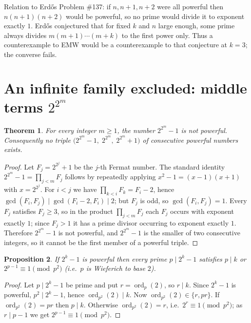 \documentclass[11pt]{article}
\newtheorem{theorem}{Theorem}[section]
\newtheorem{proposition}[theorem]{Proposition}
\theoremstyle{definition}
\begin{document}
Relation to Erdős Problem \#137: if $n,n+1,n+2$ were all powerful then
$n(n+1)(n+2)$ would be powerful, so no prime would divide it to exponent exactly $1$.
Erdős conjectured \cite{erdos1982} that for fixed $k$ and $n$ large enough, some
prime always divides $m(m+1)\cdots(m+k)$ to the first power only. Thus a
counterexample to EMW would be a counterexample to that conjecture at $k=3$; the
converse fails.

\section{An infinite family excluded: middle terms $2^{2^m}$}\label{sec:fermat}

\begin{theorem}\label{thm:fermat}
For every integer $m\ge1$, the number $2^{2^m}-1$ is not powerful. Consequently no
triple $\big(2^{2^m}-1,\;2^{2^m},\;2^{2^m}+1\big)$ of consecutive powerful numbers
exists.
\end{theorem}

\begin{proof}
Let $F_j=2^{2^j}+1$ be the $j$-th Fermat number. The standard identity
$2^{2^m}-1=\prod_{j<m}F_j$ follows by repeatedly applying $x^2-1=(x-1)(x+1)$ with
$x=2^{2^j}$. For $i<j$ we have $\prod_{k<i}F_k=F_i-2$, hence
$\gcd(F_i,F_j)\mid \gcd(F_i-2,F_i)\mid2$; but $F_j$ is odd, so $\gcd(F_i,F_j)=1$.
Every $F_j$ satisfies $F_j\ge3$, so in the product $\prod_{j<m}F_j$ each $F_j$ occurs
with exponent exactly $1$; since $F_j>1$ it has a prime divisor occurring to
exponent exactly $1$. Therefore $2^{2^m}-1$ is not powerful, and $2^{2^m}-1$ is the
smaller of two consecutive integers, so it cannot be the first member of a powerful
triple.
\end{proof}

\begin{proposition}\label{prop:wieferich}
If $2^k-1$ is powerful then every prime $p\mid 2^k-1$ satisfies $p\mid k$ or
$2^{p-1}\equiv1\pmod{p^2}$ (i.e.\ $p$ is Wieferich to base $2$).
\end{proposition}

\begin{proof}
Let $p\mid 2^k-1$ be prime and put $r=\operatorname{ord}_p(2)$, so $r\mid k$. Since
$2^k-1$ is powerful, $p^2\mid 2^k-1$, hence $\operatorname{ord}_{p^2}(2)\mid k$. Now
$\operatorname{ord}_{p^2}(2)\in\{r,pr\}$. If $\operatorname{ord}_{p^2}(2)=pr$ then
$p\mid k$. Otherwise $\operatorname{ord}_{p^2}(2)=r$, i.e.\ $2^r\equiv1\pmod{p^2}$;
as $r\mid p-1$ we get $2^{p-1}\equiv1\pmod{p^2}$.
\end{proof}
\end{document}
